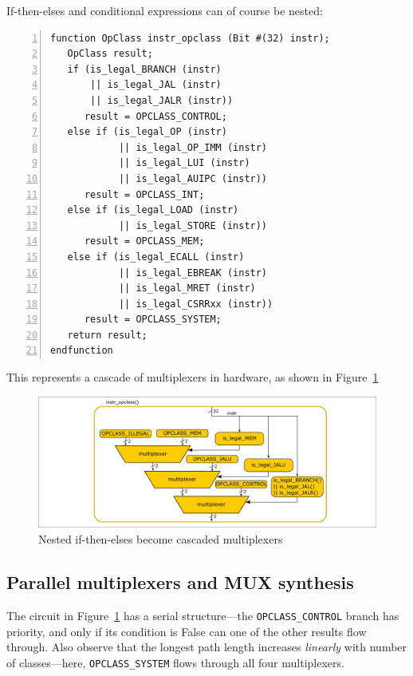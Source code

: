 If-then-elses and conditional expressions can of course be nested:


{\footnotesize
\begin{Verbatim}[frame=single, numbers=left]
function OpClass instr_opclass (Bit #(32) instr);
   OpClass result;
   if (is_legal_BRANCH (instr)
       || is_legal_JAL (instr)
       || is_legal_JALR (instr))
      result = OPCLASS_CONTROL;
   else if (is_legal_OP (instr)
            || is_legal_OP_IMM (instr)
            || is_legal_LUI (instr)
            || is_legal_AUIPC (instr))
      result = OPCLASS_INT;
   else if (is_legal_LOAD (instr)
            || is_legal_STORE (instr))
      result = OPCLASS_MEM;
   else if (is_legal_ECALL (instr)
            || is_legal_EBREAK (instr)
            || is_legal_MRET (instr)
            || is_legal_CSRRxx (instr))
      result = OPCLASS_SYSTEM;
   return result;
endfunction
\end{Verbatim}
}

This represents a cascade of multiplexers in hardware, as shown in
Figure~\ref{Fig_Combo_Multiplexer_Cascade}
\begin{figure}[htbp]
  \centerline{\includegraphics[width=6in,angle=0]{Figures/Fig_Combo_Multiplexer_Cascade}}
  \caption{\label{Fig_Combo_Multiplexer_Cascade}Nested if-then-elses become cascaded multiplexers}
\end{figure}


\subsection{Parallel multiplexers and MUX synthesis}

\label{Sec_MUXes}


The circuit in Figure~\ref{Fig_Combo_Multiplexer_Cascade} has a serial
structure---the \verb|OPCLASS_CONTROL| branch has priority, and only
if its condition is False can one of the other results flow through.
Also observe that the longest path length increases \emph{linearly}
with number of classes---here, \verb|OPCLASS_SYSTEM| flows through all
four multiplexers.


